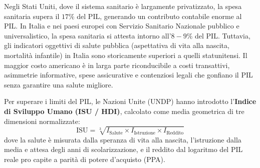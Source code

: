 \begin{empirico}
Negli Stati Uniti, dove il sistema sanitario è largamente privatizzato, la spesa sanitaria supera il $17\%$ del PIL, generando un contributo contabile enorme al PIL. In Italia e nei paesi europei con Servizio Sanitario Nazionale pubblico e universalistico, la spesa sanitaria si attesta intorno all'$8-9\%$ del PIL. Tuttavia, gli indicatori oggettivi di salute pubblica (aspettativa di vita alla nascita, mortalità infantile) in Italia sono storicamente superiori a quelli statunitensi. Il maggior costo americano è in larga parte riconducibile a costi transattivi, asimmetrie informative, spese assicurative e contenziosi legali che gonfiano il PIL senza garantire una salute migliore.

Per superare i limiti del PIL, le Nazioni Unite (UNDP) hanno introdotto l'\textbf{Indice di Sviluppo Umano (ISU / HDI)}, calcolato come media geometrica di tre dimensioni normalizzate:
\begin{equation}
    \text{ISU} = \sqrt[3]{I_{\text{Salute}} \times I_{\text{Istruzione}} \times I_{\text{Reddito}}}
\end{equation}
dove la salute è misurata dalla speranza di vita alla nascita, l'istruzione dalla media e attesa degli anni di scolarizzazione, e il reddito dal logaritmo del PIL reale pro capite a parità di potere d'acquisto (PPA).
\end{empirico}
